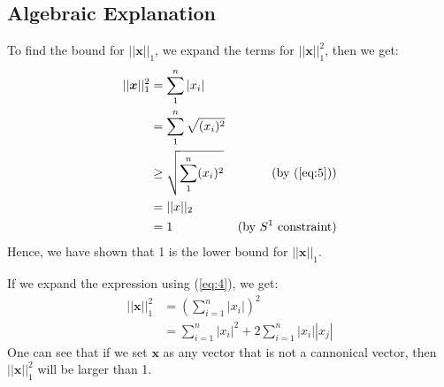\documentclass[11pt]{article}
\begin{document}
\subsection{Algebraic Explanation}
To find the bound for $||\bm{x}||_1$, we expand the terms for $||\bm{x}||_1^2$, then we get:
\begin{align*}
    ||\bm{x}||_1^2 
        &= \sum^n_1 |x_i| \\
        &= \sum^n_1 \sqrt{(x_i)^2} \\
        &\geq \sqrt{\sum^n_1 (x_i)^2} & \text{(by (\ref{eq:5}))}\\
        &= ||x||_2 \\
        &= 1 & \text{(by $S^1$ constraint)}
\end{align*}
Hence, we have shown that 1 is the lower bound for $||\bm{x}||_1$.

If we expand the expression using (\ref{eq:4}), we get:
\begin{align*}
    ||\bm{x}||_1^2
        &= (\sum^n_{i=1}|x_i|)^2 \\
        &= \sum^n_{i=1} |x_i|^2 + 2 \sum^n_{i=1}|x_i||x_j|
\end{align*}
One can see that if we set $\bm{x}$ as any vector that is not a cannonical vector, then $||\bm{x}||_1^2$ will be larger than 1. 
\end{document}
